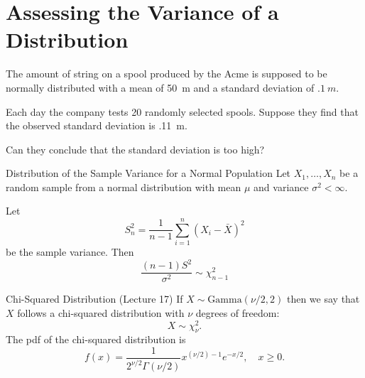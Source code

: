 \section{Assessing the Variance of a Distribution}

\begin{frame}

  \begin{block}{\example}
  The amount of string on a spool produced by the Acme is supposed to be normally distributed with a mean of 50~m and a standard deviation of $.1~m$. 
  
  \medskip
  
  Each day the company tests 20 randomly selected spools. Suppose they find that the observed standard deviation is .11~m.
  
  \medskip
  
  Can they conclude that the standard deviation is too high?
  \end{block}
\end{frame}

\begin{frame}

  \begin{block}{Distribution of the Sample Variance for a Normal Population}
    Let $X_1,\ldots,X_n$ be a random sample from a normal distribution with mean $\mu$ and variance $\sigma^2 < \infty$. 
    
    \medskip
    
    Let 
    $$
    S^2_n=\frac{1}{n-1}\sum_{i=1}^n(X_i -\bar X)^2
    $$
    be the sample variance. Then
    $$
    \frac{(n-1)S^2}{\sigma^2} \sim \chi^2_{n-1}
    $$ 
  \end{block}

\end{frame}

\begin{frame}
  \begin{block}{Chi-Squared Distribution (Lecture 17)}
    If $X \sim \mbox{Gamma}(\nu/2,2)$ then we say that $X$ follows a chi-squared distribution with $\nu$ degrees of freedom:
    \[
      X \sim \chi^2_\nu.
    \]
    The pdf of the chi-squared distribution is
    \[
      f(x)=\frac{1}{2^{\nu/2}\Gamma(\nu/2)}x^{(\nu/2)-1}e^{-x/2},\quad x \geq 0.
    \]
  \end{block}

\end{frame}

